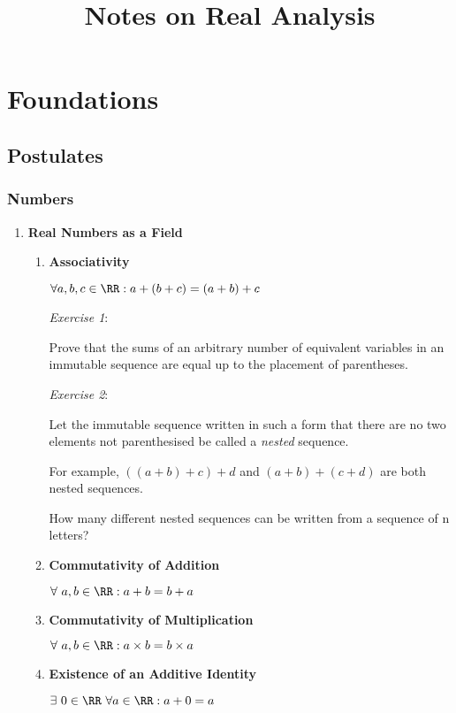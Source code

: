 \documentclass[11pt]{scrartcl}
\date{}
\title{Notes on Real Analysis}
\begin{document}
\maketitle

\section{Foundations}
\label{sec:org1f3f2b7}
\subsection{Postulates}
\label{sec:org497cd41}
\subsubsection{Numbers}
\label{sec:orgb2d9ab9}
\begin{enumerate}
\item \textbf{Real Numbers as a Field}
\label{sec:orgd43ad42}

\begin{enumerate}
\item \textbf{Associativity}

\(\forall a,b,c \in \RR: a+(b+c)=(a+b)+c\)

\emph{Exercise 1}:

Prove that the sums of an arbitrary number of equivalent variables in an immutable sequence are equal up to the placement of parentheses.

\emph{Exercise 2}:

Let the immutable sequence written in such a form that there are no two elements not parenthesised be called a \emph{nested} sequence.

For example, \(((a+b)+c)+d\) and \((a+b)+(c+d)\) are both nested sequences.

How many different nested sequences can be written from a sequence of n letters?

\item \textbf{Commutativity of Addition}

\(\forall \ a, b \in \RR: a+b=b+a\)

\item \textbf{Commutativity of Multiplication}

\(\forall \ a, b \in \RR: a \times b=b \times a\)

\item \textbf{Existence of an Additive Identity}

\(\exists \ 0\in \RR\ \forall a \in \RR: a+0=a\)


\end{enumerate}
\end{enumerate}
\end{document}
